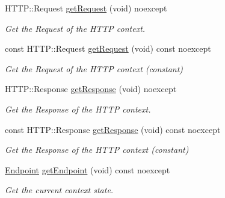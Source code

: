 \begin{DoxyCompactItemize}
H\+T\+T\+P\+::\+Request \mbox{\hyperlink{classo_z_1_1_context_ae675e54f6453c48ee8ccf96706965429}{get\+Request}} (void) noexcept
\begin{DoxyCompactList}\small\item\em Get the Request of the H\+T\+TP context. \end{DoxyCompactList}\item 
\mbox{\label{classo_z_1_1_context_adad7a501cd8fb3bb65e24fd2639c63f0}} 
const H\+T\+T\+P\+::\+Request \mbox{\hyperlink{classo_z_1_1_context_adad7a501cd8fb3bb65e24fd2639c63f0}{get\+Request}} (void) const noexcept
\begin{DoxyCompactList}\small\item\em Get the Request of the H\+T\+TP context (constant) \end{DoxyCompactList}\item 
\mbox{\label{classo_z_1_1_context_a0a3d0176018fe118531d9d4701ae87c4}} 
H\+T\+T\+P\+::\+Response \mbox{\hyperlink{classo_z_1_1_context_a0a3d0176018fe118531d9d4701ae87c4}{get\+Response}} (void) noexcept
\begin{DoxyCompactList}\small\item\em Get the Response of the H\+T\+TP context. \end{DoxyCompactList}\item 
\mbox{\label{classo_z_1_1_context_a9051e2f83289ae701d6f261cbea44fdc}} 
const H\+T\+T\+P\+::\+Response \mbox{\hyperlink{classo_z_1_1_context_a9051e2f83289ae701d6f261cbea44fdc}{get\+Response}} (void) const noexcept
\begin{DoxyCompactList}\small\item\em Get the Response of the H\+T\+TP context (constant) \end{DoxyCompactList}\item 
\mbox{\label{classo_z_1_1_context_a6409dfa205d2d292edb725ca2f82c776}} 
\mbox{\hyperlink{classo_z_1_1_endpoint}{Endpoint}} \mbox{\hyperlink{classo_z_1_1_context_a6409dfa205d2d292edb725ca2f82c776}{get\+Endpoint}} (void) const noexcept
\begin{DoxyCompactList}\small\item\em Get the current context\textquotesingle{} state. \end{DoxyCompactList}\item 

\end{DoxyCompactItemize}
